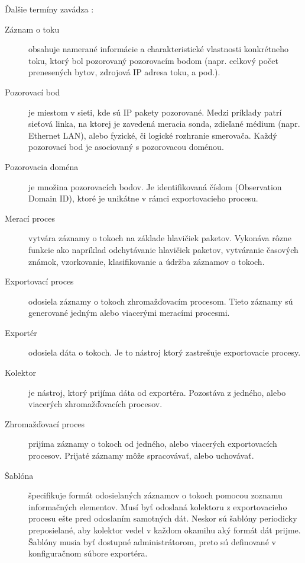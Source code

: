 Ďalšie termíny zavádza \citep{rfc5101}:
\begin{description}
  \item[Záznam o toku] obsahuje namerané informácie a charakteristické vlastnosti 
konkrétneho toku, ktorý bol pozorovaný pozorovacím bodom (napr. celkový počet prenesených 
bytov, zdrojová IP adresa toku, a pod.).

  \item[Pozorovací bod] je miestom v sieti, kde sú IP pakety pozorované. Medzi príklady patrí 
sieťová linka, na ktorej je zavedená meracia sonda, zdieľané médium (napr. Ethernet LAN), 
alebo fyzické, či logické rozhranie smerovača. Každý pozorovací bod je asociovaný s 
pozorovacou doménou. 

  \item[Pozorovacia doména] je množina pozorovacích bodov. Je identifikovaná číslom 
(Observation Domain ID), ktoré je unikátne v rámci exportovacieho procesu. 

  \item[Merací proces] vytvára záznamy o tokoch na základe hlavičiek paketov. Vykonáva 
rôzne funkcie ako napríklad odchytávanie hlavičiek paketov, vytváranie časových známok, 
vzorkovanie, klasifikovanie a údržba záznamov o tokoch. 

  \item[Exportovací proces] odosiela záznamy o tokoch zhromažďovacím 
procesom. Tieto záznamy sú generované jedným alebo viacerými meracími procesmi.
	
  \item[Exportér] odosiela dáta o tokoch. Je to nástroj ktorý zastrešuje exportovacie procesy.

  \item[Kolektor] je nástroj, ktorý prijíma dáta od exportéra. Pozostáva z jedného, alebo
viacerých zhromažďovacích procesov.

  \item[Zhromažďovací proces] prijíma záznamy o tokoch od jedného, alebo viacerých 
exportovacích procesov. Prijaté záznamy môže spracovávať, alebo uchovávať. 

  \item[Šablóna] špecifikuje formát odosielaných záznamov o tokoch pomocou zoznamu 
informačných elementov. Musí byť odoslaná kolektoru 
z exportovacieho procesu ešte pred odoslaním samotných dát. Neskor sú šablóny periodicky 
preposielané, aby kolektor vedel v každom okamihu aký formát dát prijme. 
Šablóny musia byť dostupné administrátorom, preto sú definované v konfiguračnom súbore 
exportéra.
\citep{juvhaugen}


\end{description}
